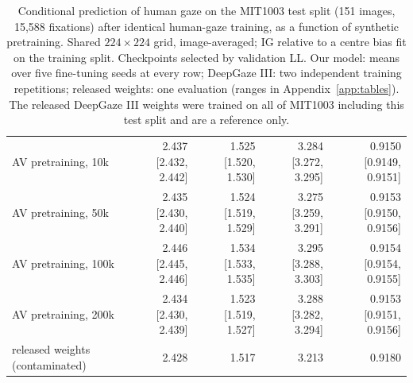 \begin{table}[t]
\begin{tabular}{lrrrr}
    AV pretraining, 10k & 2.437 \scriptsize[2.432, 2.442] & 1.525 \scriptsize[1.520, 1.530] & 3.284 \scriptsize[3.272, 3.295] & 0.9150 \scriptsize[0.9149, 0.9151] \\
    AV pretraining, 50k & 2.435 \scriptsize[2.430, 2.440] & 1.524 \scriptsize[1.519, 1.529] & 3.275 \scriptsize[3.259, 3.291] & 0.9153 \scriptsize[0.9150, 0.9156] \\
    AV pretraining, 100k & 2.446 \scriptsize[2.445, 2.446] & 1.534 \scriptsize[1.533, 1.535] & 3.295 \scriptsize[3.288, 3.303] & 0.9154 \scriptsize[0.9154, 0.9155] \\
    AV pretraining, 200k & 2.434 \scriptsize[2.430, 2.439] & 1.523 \scriptsize[1.519, 1.527] & 3.288 \scriptsize[3.282, 3.294] & 0.9153 \scriptsize[0.9151, 0.9156] \\
    \midrule
    released weights (contaminated) & 2.428 & 1.517 & 3.213 & 0.9180 \\
    \bottomrule
  \end{tabular}
  \caption{Conditional prediction of human gaze on the MIT1003 test split (151 images, 15,588 fixations) after identical human-gaze training, as a function of synthetic pretraining. Shared $224\times224$ grid, image-averaged; IG relative to a centre bias fit on the training split. Checkpoints selected by validation LL. Our model: means over five fine-tuning seeds at every row; DeepGaze III: two independent training repetitions; released weights: one evaluation (ranges in Appendix~\ref{app:tables}). The released DeepGaze III weights were trained on all of MIT1003 including this test split and are a reference only.}
  \label{tab:transfer}
\end{table}

